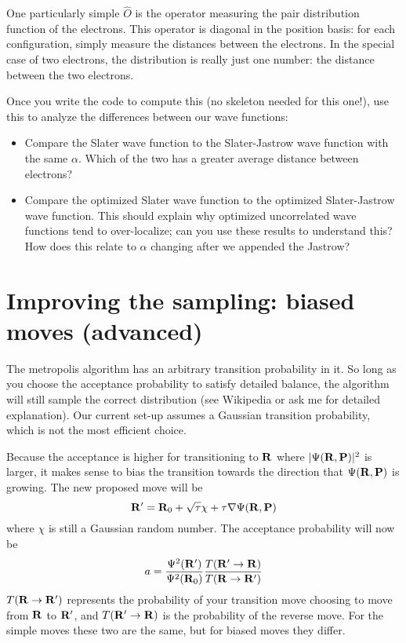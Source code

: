 \documentclass[12pt]{article}
\newcommand{\bR}{{\bf R}}
\newcommand{\bP}{{\bf P}}
\begin{document}
One particularly simple $\hat O$ is the operator measuring the pair distribution function of the electrons. 
This operator is diagonal in the position basis: for each configuration, simply measure the distances between the electrons.
In the special case of two electrons, the distribution is really just one number: the distance between the two electrons.

Once you write the code to compute this (no skeleton needed for this one!), use this to analyze the differences between our wave functions:
\begin{itemize}
  \item
    Compare the Slater wave function to the Slater-Jastrow wave function with the same $\alpha$. 
    Which of the two has a greater average distance between electrons?
  \item
    Compare the optimized Slater wave function to the optimized Slater-Jastrow wave function. 
    This should explain why optimized uncorrelated wave functions tend to over-localize; can you use these results to understand this? How does this relate to $\alpha$ changing after we appended the Jastrow?
\end{itemize}

\section{Improving the sampling: biased moves (advanced)} 

The metropolis algorithm has an arbitrary transition probability in it. 
So long as you choose the acceptance probability to satisfy detailed balance, the algorithm will still sample the correct distribution (see Wikipedia or ask me for detailed explanation).
Our current set-up assumes a Gaussian transition probability, which is not the most efficient choice.

Because the acceptance is higher for transitioning to $\bR$ where $|\Psi(\bR,\bP)|^2$ is larger, it makes sense to bias the transition towards the direction that $\Psi(\bR,\bP)$ is growing.
The new proposed move will be
\begin{equation}
  \bR'=\bR_0 + \sqrt{\tau} \chi + \tau \nabla \Psi(\bR,\bP)
\end{equation}
where $\chi$ is still a Gaussian random number.
The acceptance probability will now be 
\begin{equation}
  a=\frac{\Psi^2(\bR')}{\Psi^2(\bR_0)}
  \frac{T(\bR' \to \bR)}{T(\bR \to \bR')}
\end{equation}
$T(\bR \to \bR')$ represents the probability of your transition move choosing to move from $\bR$ to $\bR'$, and $T(\bR' \to \bR)$ is the probability of the reverse move.
For the simple moves these two are the same, but for biased moves they differ.
\end{document}
